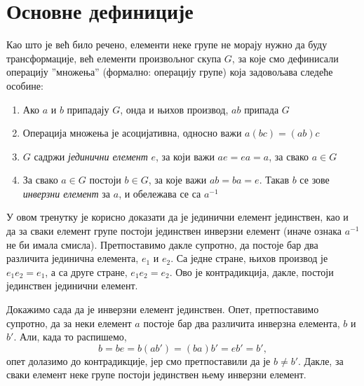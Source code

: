 \documentclass{report}
\theoremstyle{plain}
\theoremstyle{definition}
\begin{document}
\section{Основне дефиниције}
Као што је већ било речено, елементи неке групе не морају нужно да буду трансформације, већ елементи произвољног скупа $G$, за које смо дефинисали операцију ''множења'' (формално: операцију групе) која задовољава следеће особине:
\begin{enumerate}
  \item Ако $a$ и $b$ припадају $G$, онда и њихов производ, $ab$ припада $G$
  \item Операција множења је асоцијативна, односно важи $a(bc) = (ab)c$
  \item $G$ садржи \emph{јединични елемент} $e$, за који важи $ae = ea = a$, за свако $a\in G$
  \item За свако $a\in G$ постоји $b\in G$, за које важи $ab = ba = e$. Такав $b$ се зове \emph{инверзни елемент} за $a$, и обележава се са $a^{-1}$
\end{enumerate}
У овом тренутку је корисно доказати да је јединични елемент јединствен, као и да за сваки елемент групе постоји јединствен инверзни елемент (иначе ознака $a^{-1}$ не би имала смисла). Претпоставимо дакле супротно, да постоје бар два различита јединична елемента, $e_1$ и $e_2$. Са једне стране, њихов производ је $e_1 e_2 = e_1$, а са друге стране, $e_1 e_2 = e_2$. Ово је контрадикција, дакле, постоји јединствен јединични елемент.

Докажимо сада да је инверзни елемент јединствен. Опет, претпоставимо супротно, да за неки елемент $a$ постоје бар два различита инверзна елемента, $b$ и $b'$. Али, када то распишемо,
$$b = be = b(ab') = (ba)b' = eb' = b',$$
опет долазимо до контрадикције, јер смо претпоставили да је $b\neq b'$. Дакле, за сваки елемент неке групе постоји јединствен њему инверзни елемент.
\end{document}
